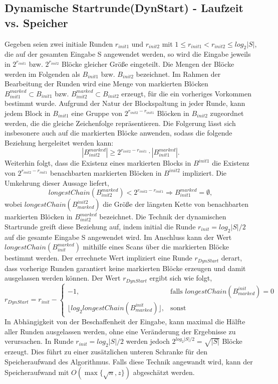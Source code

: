 \subsection{Dynamische Startrunde(DynStart) - Laufzeit vs. Speicher} \label{sec:dynstart}
Gegeben seien zwei initiale Runden $r_{init1}$ und $r_{init2}$ mit $1\leq r_{init1} < r_{init2}\leq log_2{|S|}$, die auf der gesamten Eingabe S angewendet werden, 
so wird die Eingabe jeweils in $2^{r_{init1}}$ bzw. $2^{r_{init2}}$ Blöcke gleicher Größe eingeteilt. Die Mengen der Blöcke werden im Folgenden als $B_{init1}$ bzw. $B_{init2}$ bezeichnet.
Im Rahmen der Bearbeitung der Runden wird eine Menge von markierten Blöcken $B_{init1}^{marked}\subset B_{init1}$ bzw. $B_{init2}^{marked}\subset B_{init2}$ erzeugt, für die ein vorheriges
Vorkommen bestimmt wurde. Aufgrund der Natur der Blockspaltung in jeder Runde, kann jedem Block in $B_{init1}$ eine Gruppe von $2^{r_{init2}-r_{init1}}$ Blöcken in $B_{init2}$ zugeordnet
werden, die die gleiche Zeichenfolge repräsentieren. Die Folgerung lässt sich insbesonere auch auf die markierten Blöcke anwenden, sodass die folgende Beziehung hergeleitet werden kann:
\begin{equation}
    |B_{init2}^{marked}| \geq 2^{r_{init2}-r_{init1}} \cdot |B_{init1}^{marked}|.
\end{equation}
Weiterhin folgt, dass die Existenz eines markierten Blocks in $B^{init1}$ die Existenz von $2^{r_{init2}-r_{init1}}$ benachbarten markierten Blöcken in $B^{init2}$ impliziert. Die
Umkehrung dieser Aussage liefert,
\begin{equation}
    longestChain(B_{init2}^{marked}) < 2^{r_{init2}-r_{init1}} \Rightarrow B_{init1}^{marked}=\emptyset, 
\end{equation}
wobei $longestChain(B^{init2}_{marked})$ die Größe der längsten Kette von benachbarten markierten Blöcken in $B_{init2}^{marked}$ bezeichnet.
Die Technik der dynamischen Startrunde greift diese Beziehung auf, indem initial die Runde $r_{init}=log_2{|S|}/2$ auf die gesamte Eingabe S angewendet wird. Im Anschluss
kann der Wert $longestChain(B_{init}^{marked})$ mithilfe eines Scans über die markierten Blöcke bestimmt werden. Der errechnete Wert impliziert eine Runde $r_{DynStart}$ derart,
dass vorherige Runden garantiert keine markierten Blöcke erzeugen und damit ausgelassen werden können. Der Wert $r_{DynStart}$ ergibt sich wie folgt,
\begin{equation}
    r_{DynStart} = r_{init}-
    \begin{cases}
        -1, & \text{falls } longestChain(B^{init}_{marked}) = 0\\
        \lfloor log_2{longestChain(B^{init}_{marked})} \rfloor, & \text{sonst}
    \end{cases}
\end{equation}
In Abhängigkeit von der Beschaffenheit der Eingabe, kann maximal die Hälfte aller Runden ausgelassen werden, ohne eine Veränderung der Ergebnisse zu verursachen. In
Runde $r_{init}=log_2{|S|}/2$ werden jedoch $2^{log_2{|S|}/2}=\sqrt{|S|}$ Blöcke erzeugt. Dies führt zu einer zusätzlichen unteren Schranke für den Speicheraufwand des Algorithmus.
Falls diese Technik angewandt wird, kann der Speicheraufwand mit $O(\max\{\sqrt{n}, z\})$ abgeschätzt werden.

